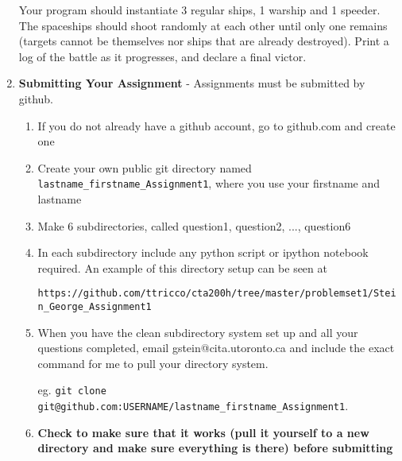 \documentclass[]{article}
\begin{document}
\begin{enumerate}
Your program should instantiate 3 regular ships, 1 warship and 1 speeder. The spaceships should shoot randomly at each other until only one remains (targets cannot be themselves nor ships that are already destroyed). Print a log of the battle as it progresses, and declare a final victor.


\item \textbf{Submitting Your Assignment} - Assignments must be submitted by github.

\begin{enumerate}
\item If you do not already have a github account, go to github.com and create one
\item Create your own public git directory named \verb|lastname_firstname_Assignment1|, where you use your firstname and lastname
\item Make 6 subdirectories, called question1, question2, ..., question6
\item In each subdirectory include any python script or ipython notebook required. An example of this directory setup can be seen at
 
\hspace{-2cm}\verb|https://github.com/ttricco/cta200h/tree/master/problemset1/Stein_George_Assignment1|
\item When you have the clean subdirectory system set up and all your questions completed, email gstein@cita.utoronto.ca and include the exact command for me to pull your directory system. 

eg. \verb|git clone git@github.com:USERNAME/lastname_firstname_Assignment1|. 
\item \textbf{Check to make sure that it works (pull it yourself to a new directory and make sure everything is there) before submitting}

\end{enumerate}
\end{enumerate}
\end{document}
